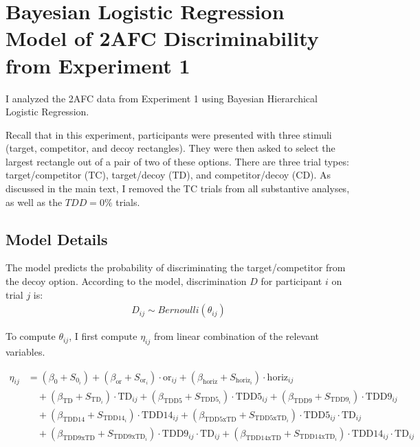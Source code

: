 \chapter{Bayesian Logistic Regression Model of 2AFC Discriminability from Experiment 1}
I analyzed the 2AFC data from Experiment 1 using Bayesian Hierarchical Logistic Regression. 

Recall that in this experiment, participants were presented with three stimuli (target, competitor, and decoy rectangles). They were then asked to select the largest rectangle out of a pair of two of these options. There are three trial types: target/competitor (TC), target/decoy (TD), and competitor/decoy (CD). As discussed in the main text, I removed the TC trials from all substantive analyses, as well as the $TDD=0\%$ trials. 

\section{Model Details} 

The model predicts the probability of discriminating the target/competitor from the decoy option. According to the model, discrimination $D$ for participant $i$ on trial $j$ is:
\begin{align}
    D_{ij} \sim Bernoulli(\theta_{ij})
\end{align}

To compute $\theta_{ij}$, I first compute $\eta_{ij}$ from linear combination of the relevant variables.

\begin{equation}
    \begin{aligned}
        \eta_{ij} &= (\beta_{0} + S_{0_{i}}) + (\beta_{\mathrm{or}} + S_{\mathrm{or}_{i}}) \cdot \mathrm{or}_{ij} 
        + (\beta_{\mathrm{horiz}} + S_{\mathrm{horiz}_{i}}) \cdot \mathrm{horiz}_{ij} \\
        &\quad + (\beta_{\mathrm{TD}} + S_{\mathrm{TD}_{i}}) \cdot \mathrm{TD}_{ij} 
        + (\beta_{\mathrm{TDD5}} + S_{\mathrm{TDD5}_{i}}) \cdot \mathrm{TDD5}_{ij} 
        + (\beta_{\mathrm{TDD9}} + S_{\mathrm{TDD9}_{i}}) \cdot \mathrm{TDD9}_{ij} \\
        &\quad + (\beta_{\mathrm{TDD14}} + S_{\mathrm{TDD14}_{i}}) \cdot \mathrm{TDD14}_{ij} 
        + (\beta_{\mathrm{TDD5xTD}} + S_{\mathrm{TDD5xTD}_{i}}) \cdot \mathrm{TDD5}_{ij} \cdot \mathrm{TD}_{ij} \\
        &\quad + (\beta_{\mathrm{TDD9xTD}} + S_{\mathrm{TDD9xTD}_{i}}) \cdot \mathrm{TDD9}_{ij} \cdot \mathrm{TD}_{ij} 
        + (\beta_{\mathrm{TDD14xTD}} + S_{\mathrm{TDD14xTD}_{i}}) \cdot \mathrm{TDD14}_{ij} \cdot \mathrm{TD}_{ij}
    \end{aligned}
\end{equation}

